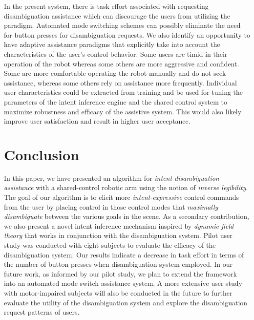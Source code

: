 \documentclass[natbib, twocolumn]{svjour3}          %
\begin{document}
 In the present system, there is task effort associated with requesting disambiguation assistance which can discourage the users from utilizing the paradigm. Automated mode switching schemes can possibly eliminate the need for button presses for disambiguation requests. 
 We also identify an opportunity to have adaptive assistance
 paradigms that explicitly take into account the characteristics of the user's control behavior. Some users are timid in their operation of the robot whereas some others are more aggressive and confident. Some are more comfortable operating the robot manually and do not seek assistance, whereas some others rely on assistance more frequently. Individual user characteristics could be extracted from training and be used for tuning the parameters of the intent inference engine and the shared control system to maximize robustness and efficacy of the assistive system. This would also likely improve user satisfaction and result in higher user acceptance. 
 
  
\section{Conclusion}\label{sec:conclusions}
In this paper, we have presented an algorithm for \textit{intent disambiguation assistance} with a shared-control robotic arm using the notion of \textit{inverse legibility}. The goal of our algorithm is to elicit more \textit{intent-expressive} control commands from the user by placing control in those control modes that \textit{maximally disambiguate} between the various goals in the scene. As a secondary contribution, we also present a novel intent inference mechanism inspired by \textit{dynamic field theory} that works in conjunction with the disambiguation system. Pilot user study was conducted with eight subjects to evaluate the efficacy of the disambiguation system. Our results indicate a decrease in task effort in terms of the number of button presses when disambiguation system employed. In our future work, as informed by our pilot study, we plan to extend the framework into an automated mode switch assistance system. A more extensive user study with motor-impaired subjects will also be conducted in the future to further evaluate the utility of the disambiguation system and explore the disambiguation request patterns of users.  
\end{document}
